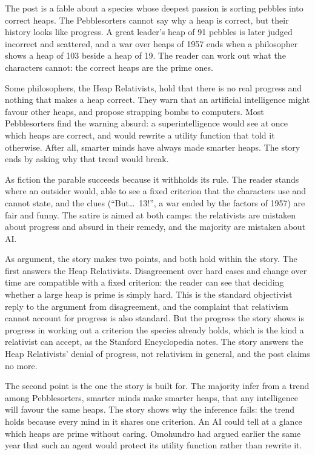 \begin{afterword}
\summaryhead

The post is a fable about a species whose deepest passion is sorting pebbles into correct heaps. The Pebblesorters cannot say why a heap is correct, but their history looks like progress. A great leader's heap of 91 pebbles is later judged incorrect and scattered, and a war over heaps of 1957 ends when a philosopher shows a heap of 103 beside a heap of 19. The reader can work out what the characters cannot: the correct heaps are the prime ones.

Some philosophers, the Heap Relativists, hold that there is no real progress and nothing that makes a heap correct. They warn that an artificial intelligence might favour other heaps, and propose strapping bombs to computers. Most Pebblesorters find the warning absurd: a superintelligence would see at once which heaps are correct, and would rewrite a utility function that told it otherwise. After all, smarter minds have always made smarter heaps. The story ends by asking why that trend would break.

\responsehead

As fiction the parable succeeds because it withholds its rule. The reader stands where an outsider would, able to see a fixed criterion that the characters use and cannot state, and the clues (``But\ldots\ 13!'', a war ended by the factors of 1957) are fair and funny. The satire is aimed at both camps: the relativists are mistaken about progress and absurd in their remedy, and the majority are mistaken about AI.

As argument, the story makes two points, and both hold within the story. The first answers the Heap Relativists. Disagreement over hard cases and change over time are compatible with a fixed criterion: the reader can see that deciding whether a large heap is prime is simply hard. This is the standard objectivist reply to the argument from disagreement, and the complaint that relativism cannot account for progress is also standard. But the progress the story shows is progress in working out a criterion the species already holds, which is the kind a relativist can accept, as the Stanford Encyclopedia notes. The story answers the Heap Relativists' denial of progress, not relativism in general, and the post claims no more.

The second point is the one the story is built for. The majority infer from a trend among Pebblesorters, smarter minds make smarter heaps, that any intelligence will favour the same heaps. The story shows why the inference fails: the trend holds because every mind in it shares one criterion. An AI could tell at a glance which heaps are prime without caring. Omohundro had argued earlier the same year that such an agent would protect its utility function rather than rewrite it.


\end{afterword}
